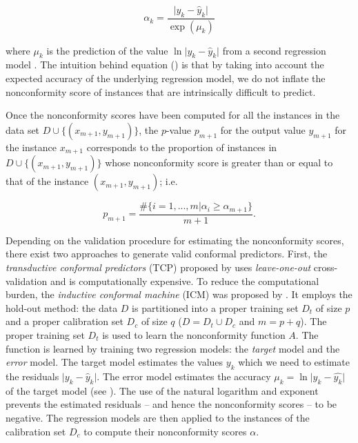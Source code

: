 \documentclass[pmlr]{jmlr}%
\begin{document}
\begin{equation}
\label{eq:norm}
\alpha_k = \frac{\lvert y_k - \hat{y}_k\rvert}{\exp(\mu_k)}
\end{equation}

\noindent where $\mu_k$ is the prediction of the value $\ln \lvert y_k - \hat{y}_k \rvert$ from a second regression model \citep{Papadopoulos.2011}. The intuition behind equation () is that by taking into account the expected accuracy of the underlying regression model, we do not inflate the nonconformity score of instances that are intrinsically difficult to predict.

Once the nonconformity scores have been computed for all the instances in the data set  $D \cup \{(x_{m+1},y_{m+1})\}$, the $p$-value $p_{m+1}$ for the output value  $y_{m+1}$ for the instance $x_{m+1}$ corresponds to the proportion of instances in $D \cup \{(x_{m+1},y_{m+1})\}$ whose nonconformity score is greater than or equal to that of the instance $(x_{m+1},y_{m+1})$; i.e.

\begin{equation}
\label{eq:p}
p_{m+1} = \frac{\#\{i= 1,...,m|\alpha_i \geq \alpha_{m+1}\} }{m+1}.
\end{equation}

Depending on the validation procedure for estimating the nonconformity scores, there exist two approaches to generate valid conformal predictors. First, the \textit{transductive conformal predictors} (TCP) proposed by \citet{Saunders.1999} uses \textit{leave-one-out} cross-validation and is computationally expensive. To reduce the computational burden, the \textit{inductive conformal machine} (ICM) was proposed by \citet{Papadopoulos.2002}. It employs the hold-out method: the data $D$ is partitioned into a proper training set $D_t$ of size $p$ and a proper calibration set $D_c$ of size $q$ ($D = D_t \cup D_c$ and $m = p + q$). The proper training set $D_t$ is used to learn the nonconformity function $A$. The function is learned by training two regression models: the \textit{target} model and the \textit{error} model. The target model estimates the values $y_k$ which we need to estimate the residuals $\lvert y_k - \hat{y}_k\rvert$. The error model estimates the accuracy $\mu_k = \ln \lvert y_k - \hat{y_k} \rvert$ of the target model (see ). The use of the natural logarithm and exponent prevents the estimated residuals -- and hence the nonconformity scores -- to be negative. The regression models are then applied to the instances of the calibration set $D_c$ to compute their nonconformity scores $\alpha$.
\end{document}
